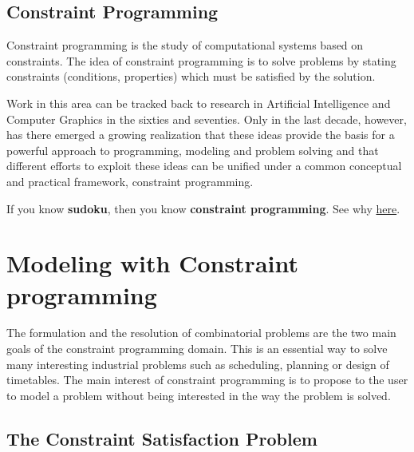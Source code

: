 \subsection{Constraint Programming}\label{introduction:constraintprogramming}\hypertarget{introduction:constraintprogramming}{}
Constraint programming is the study of computational systems based on constraints. The idea of constraint programming is to solve problems by stating constraints (conditions, properties) which must be satisfied by the solution.

Work in this area can be tracked back to research in Artificial Intelligence and Computer Graphics in the sixties and seventies. Only in the last decade, however, has there emerged a growing realization that these ideas provide the basis for a powerful approach to programming, modeling and problem solving and that different efforts to exploit these ideas can be unified under a common conceptual and practical framework, constraint programming. 

\begin{note}
If you know \textbf{sudoku}, then you know \textbf{constraint programming}. See why \hyperlink{sudokuandcp}{here}.
\end{note}


\section{Modeling with Constraint programming}\label{introduction:modelingwithconstraintprogramming}\hypertarget{introduction:modelingwithconstraintprogramming}{}
The formulation and the resolution of combinatorial problems are the two main goals of the constraint programming domain. This is an essential way to solve many interesting industrial problems such as scheduling, planning or design of timetables. The main interest of constraint programming is to propose to the user to model a problem without being interested in the way the problem is solved.

\subsection{The Constraint Satisfaction Problem}\label{introduction:csp}\hypertarget{introduction:csp}{}

